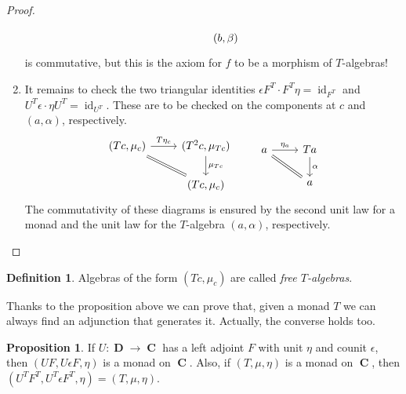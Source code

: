 \documentclass[a4paper,11pt,twoside, openany]{book}
\DeclareMathOperator{\C}{\mathbf{C}}
\DeclareMathOperator{\D}{\mathbf{D}}
\DeclareMathOperator{\id}{id}
\theoremstyle{definition}
\theoremstyle{definition}
\newtheorem{defn}[thm]{Definition} %
\newtheorem{prop}[thm]{Proposition}
\theoremstyle{remark}
\begin{document}
\begin{proof}
\begin{enumerate}[label=(\roman*)]
\[\begin{tikzcd}
			& (b,\beta)
			\end{tikzcd}
			\]
			is commutative, but this is the axiom for $f$ to be a morphism of $T$-algebras! 
			\item It remains to check the two triangular identities $\epsilon F^T \cdot F^T\eta=\id_{F^T}$ and $U^T\epsilon\cdot\eta U^T=\id_{U^T}$. These are to be checked on the components at $c$ and $(a, \alpha)$, respectively.
			\[
			\begin{tikzcd}
			(Tc,\mu_c)\ar["T\eta_{c}",rightarrow]{r}\ar[equal]{dr}
			& (T^2c,\mu_{Tc})\ar["\mu_{Tc}", rightarrow]{d}
			\\
			& (Tc,\mu_c)
			\end{tikzcd}	\quad\quad
			\begin{tikzcd}
			a\ar["\eta_a",rightarrow]{r}\ar[equal]{dr}
			& Ta\ar["\alpha", rightarrow]{d}
			\\
			& a
			\end{tikzcd}
			\]
			The commutativity of these diagrams is ensured by the second unit law for a monad and the unit law for the $T$-algebra $(a,\alpha)$, respectively. \qedhere
		\end{enumerate}
	\end{proof}
	\begin{defn}
		Algebras of the form $(Tc, \mu_c)$ are called \emph{free $T$-algebras}.
	\end{defn}
	Thanks to the proposition above we can prove that, given a monad $T$ we can always find an adjunction that generates it. Actually, the converse holds too.
	\begin{prop}
		If $U\colon\D\to\C$ has a left adjoint $F$ with unit $\eta$ and counit $\epsilon$, then $(UF,U\epsilon F,\eta)$ is a monad on $\C$. Also, if $(T,\mu,\eta)$ is a monad on $\C$, then $(U^TF^T,U^T\epsilon F^T,\eta)=(T,\mu,\eta)$. 
	\end{prop}
\end{document}
